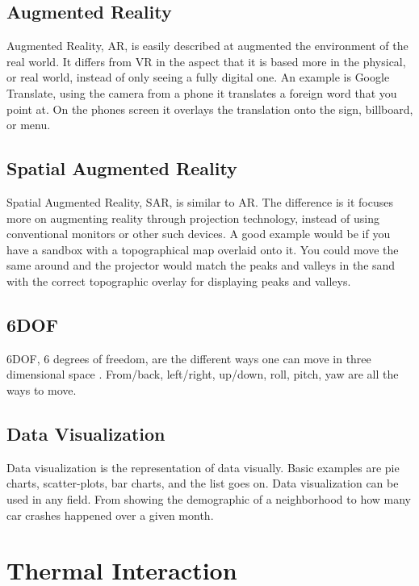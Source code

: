 \documentclass{sig-alternate}
\begin{document}
\subsection{Augmented Reality}
\label{sec:Augmented Reality}
Augmented Reality, AR, is easily described at augmented the environment of the real world. It differs from VR in the aspect that it is based more in the physical, or real world, instead of only seeing a fully digital one. An example is Google Translate, using the camera from a phone it translates a foreign word that you point at. On the phones screen it overlays the translation onto the sign, billboard, or menu. 


\subsection{Spatial Augmented Reality}
\label{sec:Spatial Augmented Reality}
Spatial Augmented Reality, SAR, is similar to AR. The difference is it focuses more on augmenting reality through projection technology, instead of using conventional monitors or other such devices. A good example would be if you have a sandbox with a topographical map overlaid onto it. You could move the same around and the projector would match the peaks and valleys in the sand with the correct topographic overlay for displaying peaks and valleys.  

\subsection{6DOF}
\label{sec:6DOF}
6DOF, 6 degrees of freedom, are the different ways one can move in three dimensional space . From/back, left/right, up/down, roll, pitch, yaw are all the ways to move.
 


\subsection{Data Visualization}
\label{sec:Data Visualization}
Data visualization is the representation of data visually. Basic examples are pie charts, scatter-plots, bar charts, and the list goes on. Data visualization can be used in any field. From showing the demographic of a neighborhood to how many car crashes happened over a given month.   

\section{Thermal Interaction}
\label{sec:Thermal Interaction}
\end{document}
